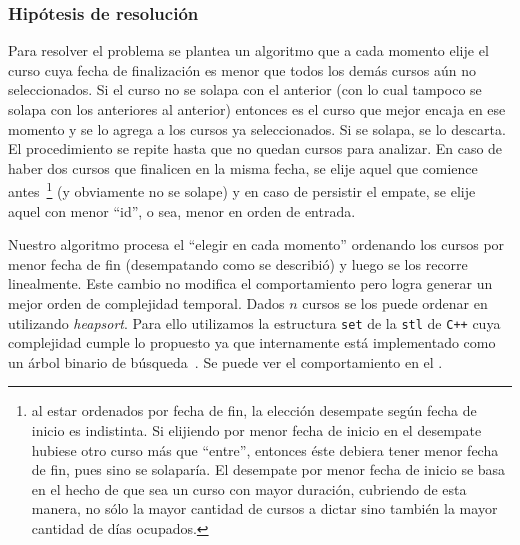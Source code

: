 \documentclass[11pt, a4paper, twoside]{article}
\begin{document}
\subsubsection{Hipótesis de resolución}

Para resolver el problema se plantea un algoritmo que a cada momento elije el curso
cuya fecha de finalización es menor que todos los demás cursos aún no seleccionados.
Si el curso no se solapa con el anterior (con lo cual tampoco se solapa con los anteriores
al anterior) entonces es el curso que mejor encaja en ese momento y se lo agrega
a los cursos ya seleccionados. Si se solapa, se lo descarta. El procedimiento se repite
hasta que no quedan cursos para analizar. En caso de haber dos cursos que finalicen
en la misma fecha, se elije aquel que comience antes~\footnote{al estar ordenados por fecha de fin,
la elección desempate según fecha de inicio es indistinta.
Si elijiendo por menor fecha de inicio en el desempate hubiese otro curso más que \enquote{entre},
entonces éste debiera tener menor fecha de fin, pues sino se solaparía.
El desempate por menor fecha de inicio se basa en el hecho de que sea un curso con mayor duración, cubriendo
de esta manera, no sólo la mayor cantidad de cursos a dictar sino también la mayor cantidad
de días ocupados.} (y obviamente no se solape) y
en caso de persistir el empate, se elije aquel con menor \enquote{id}, o sea, menor
en orden de entrada.

Nuestro algoritmo procesa el \enquote{elegir en cada momento} ordenando los
cursos por menor fecha de fin (desempatando como se describió) y luego se los recorre
linealmente. Este cambio no modifica el comportamiento pero logra generar un
mejor orden de complejidad temporal. Dados $n$ cursos se los puede ordenar en
 utilizando \textit{heapsort}. Para ello utilizamos la estructura
\texttt{set} de la \texttt{stl} de \texttt{C++} cuya complejidad cumple lo propuesto
ya que internamente está implementado como un árbol binario de búsqueda~.
Se puede ver el comportamiento en el .
\end{document}

